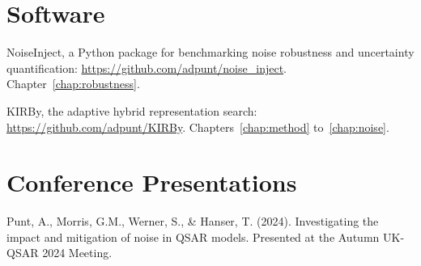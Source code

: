 \section*{Software}
NoiseInject, a Python package for benchmarking noise robustness and uncertainty quantification: \url{https://github.com/adpunt/noise_inject}. Chapter~\ref{chap:robustness}.

KIRBy, the adaptive hybrid representation search: \url{https://github.com/adpunt/KIRBy}. Chapters~\ref{chap:method} to~\ref{chap:noise}.

\section*{Conference Presentations}
Punt, A., Morris, G.M., Werner, S., \& Hanser, T. (2024). Investigating the impact and mitigation of noise in QSAR models. Presented at the Autumn UK-QSAR 2024 Meeting.
